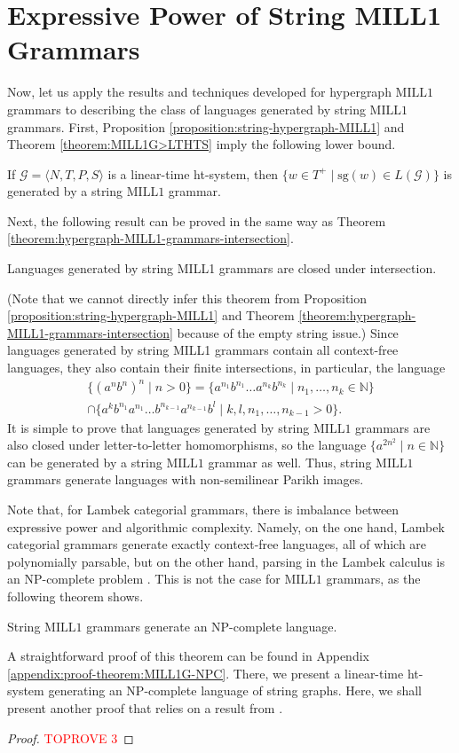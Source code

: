 \documentclass[a4paper,UKenglish,cleveref, autoref, thm-restate,pdfa]{lipics-v2021}
\newcommand{\Nat}{\mathbb{N}}
\newcommand{\Gram}{\mathcal{G}}
\newcommand{\SG}{\mathrm{sg}}
\newcommand{\MILLFO}{\mathrm{MILL}1}
\begin{document}
\section{Expressive Power of String MILL1 Grammars}\label{section:MILL1-grammars}

Now, let us apply the results and techniques developed for hypergraph $\MILLFO$ grammars to describing the class of languages generated by string $\MILLFO$ grammars. First, Proposition \ref{proposition:string-hypergraph-MILL1} and Theorem \ref{theorem:MILL1G>LTHTS} imply the following lower bound.
\begin{corollary}\label{corollary:string-MILL1-grammars}
	If $\Gram = \langle N, T, P, S \rangle$ is a linear-time ht-system, then $\{w \in T^+ \mid \SG(w) \in L(\Gram)\}$ is generated by a string $\MILLFO$ grammar.
\end{corollary}

Next, the following result can be proved in the same way as Theorem \ref{theorem:hypergraph-MILL1-grammars-intersection}.
\begin{theorem}
	Languages generated by string MILL1 grammars are closed under intersection.
\end{theorem}
(Note that we cannot directly infer this theorem from Proposition \ref{proposition:string-hypergraph-MILL1} and Theorem \ref{theorem:hypergraph-MILL1-grammars-intersection} because of the empty string issue.)
Since languages generated by string MILL1 grammars contain all context-free languages, they also contain their finite intersections, in particular, the language 
\begin{multline*}
	\{(a^nb^n)^n \mid n > 0 \} = \{a^{n_1}b^{n_1}\ldots a^{n_k}b^{n_k} \mid n_1,\ldots,n_k \in \Nat\} \\ \cap \{a^{k}b^{n_1}a^{n_1}\ldots b^{n_{k-1}} a^{n_{k-1}} b^l \mid k,l,n_1,\ldots,n_{k-1} >0 \}.
\end{multline*}
It is simple to prove that languages generated by string $\MILLFO$ grammars are also closed under letter-to-letter homomorphisms, so the language $\{a^{2n^2} \mid n \in \Nat\}$ can be generated by a string $\MILLFO$ grammar as well. Thus, string $\MILLFO$ grammars generate languages with non-semilinear Parikh images.

Note that, for Lambek categorial grammars, there is imbalance between expressive power and algorithmic complexity. Namely, on the one hand, Lambek categorial grammars generate exactly context-free languages, all of which are polynomially parsable, but on the other hand, parsing in the Lambek calculus is an NP-complete problem \cite{Pentus06}. This is not the case for $\MILLFO$ grammars, as the following theorem shows.
\begin{theorem}\label{theorem:MILL1G-NPC}
	String $\MILLFO$ grammars generate an NP-complete language.
\end{theorem}
A straightforward proof of this theorem can be found in Appendix \ref{appendix:proof-theorem:MILL1G-NPC}. There, we present a linear-time ht-system generating an NP-complete language of string graphs. Here, we shall present another proof that relies on a result from \cite{Book78}.
\begin{proof}\textcolor{red}{TOPROVE 3}\end{proof}
\end{document}
